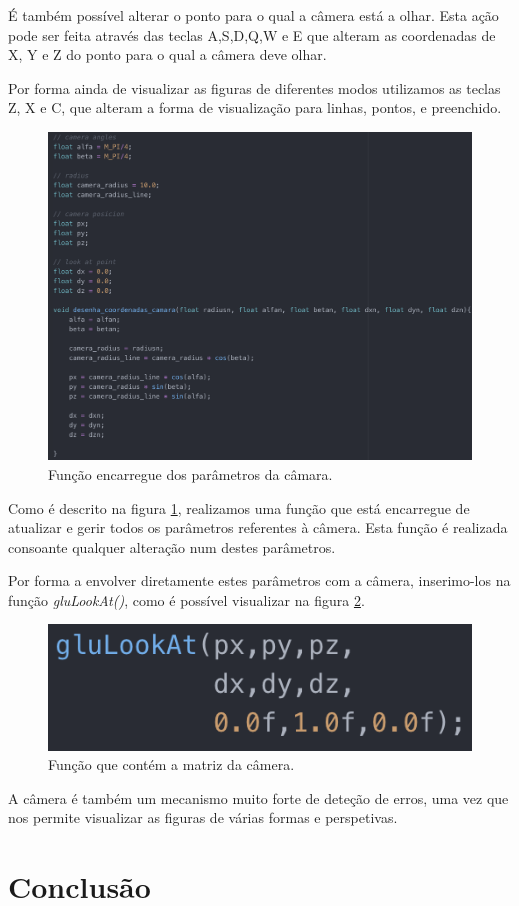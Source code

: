 \documentclass[a4paper]{article}
\begin{document}
É também possível alterar o ponto para o qual a câmera está a olhar. Esta ação pode ser feita através das teclas A,S,D,Q,W e E que alteram as coordenadas de X, Y e Z do ponto para o qual a câmera deve olhar.

Por forma ainda de visualizar as figuras de diferentes modos utilizamos as teclas Z, X e C, que alteram a forma de visualização para linhas, pontos, e preenchido.

\begin{figure}[H]
\centering
\includegraphics[scale=0.40]{funcao_desenha.png}
\caption{Função encarregue dos parâmetros da câmara.}
\label{img:desenha}
\end{figure}

Como é descrito na figura \ref{img:desenha}, realizamos uma função que está encarregue de atualizar e gerir todos os parâmetros referentes à câmera. Esta função é realizada consoante qualquer alteração num destes parâmetros.

Por forma a envolver diretamente estes parâmetros com a câmera, inserimo-los na função \emph{gluLookAt()}, como é possível visualizar na figura \ref{img:glulookat}.

\begin{figure}[H]
\centering
\includegraphics[scale=0.70]{gluLookAt.png}
\caption{Função que contém a matriz da câmera.}
\label{img:glulookat}
\end{figure}

A câmera é também um mecanismo muito forte de deteção de erros, uma vez que nos permite visualizar as figuras de várias formas e perspetivas.


\section{Conclusão}
\label{sec:conclusao}
\end{document}
